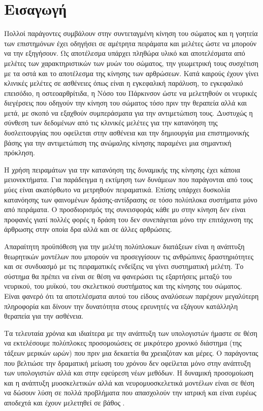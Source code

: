 \chapter{Εισαγωγή}

Πολλοί παράγοντες συμβάλουν στην συντεταγμένη κίνηση του σώματος και η γοητεία των επιστημόνων έχει οδηγήσει σε αμέτρητα πειράματα και μελέτες ώστε να μπορούν να την εξηγήσουν. Ως αποτέλεσμα υπάρχει πληθώρα υλικό και αποτελέσματα από μελέτες των χαρακτηριστικών των μυών του σώματος, την γεωμετρική τους συσχέτιση με τα οστά και το αποτέλεσμα της κίνησης των αρθρώσεων. Κατά καιρούς έχουν γίνει κλινικές μελέτες σε ασθένειες όπως είναι η εγκεφαλική παράλυση, το εγκεφαλικό επεισόδιο, η οστεοαρθρίτιδα, η Νόσο του Πάρκινσον ώστε να μελετηθούν οι νευρικές διεγέρσεις που οδηγούν την κίνηση του σώματος τόσο πριν την θεραπεία αλλά και μετά, με σκοπό να εξαχθούν συμπεράσματα για την αντιμετώπιση τους. Δυστυχώς η σύνθεση των δεδομένων από τις κλινικές μελέτες για την κατανόηση της δυσλειτουργίας που οφείλεται στην ασθένεια και την δημιουργία μια επιστημονικής βάσης για την αντιμετώπιση της ανώμαλης κίνησης παραμένει μια σημαντική πρόκληση.

Η χρήση πειραμάτων για την κατανόηση της δυναμικής της κίνησης έχει κάποια μειονεκτήματα. Για παράδειγμα η εκτίμηση των δυνάμεων που παράγονται από τους μύες είναι ακατόρθωτο να μετρηθούν πειραματικά. Επίσης υπάρχει δυσκολία κατανόησης των φαινομένων δράσης-αντίδρασης σε τόσο πολύπλοκα συστήματα μόνο από πειράματα. Ο προσδιορισμός της συνεισφοράς κάθε μυ στην κίνηση δεν είναι προφανές γιατί πολλές φορές η δράση του δεν συνεπάγεται μόνο την επιτάχυνση της άρθρωσης στην οποία δρα \cite{zajac-gordon89} αλλά και σε άλλες αρθρώσεις.

Απαραίτητη προϋπόθεση για την μελέτη πολύπλοκων διατάξεων είναι η ανάπτυξη θεωρητικών μοντέλων που μπορούν να προσεγγίσουν τις ανθρώπινες δραστηριότητες και σε συνδυασμό με τις πειραματικές ενδείξεις να γίνει συστηματική μελέτη. Το σύστημα θα πρέπει να είναι σε θέση να φανερώσει τις εξαρτήσεις μεταξύ του νευρικού, του μυϊκού, του σκελετικού συστήματος και της κίνησης του σώματος. Είναι φανερό ότι τα αποτελέσματα αυτού του είδους αναλύσεων παρέχουν μεγαλύτερη πληροφορία και δίνουν την δυνατότητα στους ερευνητές να εξάγουν κατάλληλη θεραπεία για την ασθένεια.

Τα τελευταία χρόνια και ιδιαίτερα με την ανάπτυξη των υπολογιστών ήμαστε σε θέση να εκτελέσουμε πολύπλοκες προσομοιώσεις σε μικρότερο χρονικό διάστημα (της τάξεων μερικών ωρών) που πριν μια δεκαετία θα χρειαζόταν και μέρες. Ο παράγοντας που βελτιώσε την δραματική μείωση του χρόνου δεν οφείλεται μόνο στην ανάπτυξη των υπολογιστών αλλά και στην εφεύρεση νέων μεθόδων. Η δυναμική προσομοίωση και η ανάπτυξη μυοσκελετικών αλλά και νευρομυοσκελετικά μοντέλων είναι σε θέση να δώσουν λύση σε πολλά προβλήματα που απασχολούν την ιατρική και είναι ευρέως αποδεχτά και έχουν μελετηθεί σε βάθος \cite{thelen-chumanov06, piazza06, pandy01, zajac02}.

